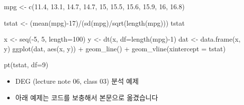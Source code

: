 \documentclass[
]{book}
\newenvironment{Shaded}{\begin{snugshade}}{\end{snugshade}}
\newcommand{\AttributeTok}[1]{\textcolor[rgb]{0.77,0.63,0.00}{#1}}
\newcommand{\DecValTok}[1]{\textcolor[rgb]{0.00,0.00,0.81}{#1}}
\newcommand{\FloatTok}[1]{\textcolor[rgb]{0.00,0.00,0.81}{#1}}
\newcommand{\FunctionTok}[1]{\textcolor[rgb]{0.00,0.00,0.00}{#1}}
\newcommand{\NormalTok}[1]{#1}
\newcommand{\OtherTok}[1]{\textcolor[rgb]{0.56,0.35,0.01}{#1}}
\newcommand{\SpecialCharTok}[1]{\textcolor[rgb]{0.00,0.00,0.00}{#1}}
\providecommand{\tightlist}{%
  \setlength{\itemsep}{0pt}\setlength{\parskip}{0pt}}
\begin{document}
\begin{Shaded}
\begin{Highlighting}[]
\NormalTok{mpg }\OtherTok{\textless{}{-}} \FunctionTok{c}\NormalTok{(}\FloatTok{11.4}\NormalTok{, }\FloatTok{13.1}\NormalTok{, }\FloatTok{14.7}\NormalTok{, }\FloatTok{14.7}\NormalTok{, }\DecValTok{15}\NormalTok{, }\FloatTok{15.5}\NormalTok{, }\FloatTok{15.6}\NormalTok{, }\FloatTok{15.9}\NormalTok{, }\DecValTok{16}\NormalTok{, }\FloatTok{16.8}\NormalTok{)}

\NormalTok{tstat }\OtherTok{\textless{}{-}}\NormalTok{ (}\FunctionTok{mean}\NormalTok{(mpg)}\SpecialCharTok{{-}}\DecValTok{17}\NormalTok{)}\SpecialCharTok{/}\NormalTok{(}\FunctionTok{sd}\NormalTok{(mpg)}\SpecialCharTok{/}\FunctionTok{sqrt}\NormalTok{(}\FunctionTok{length}\NormalTok{(mpg)))}
\NormalTok{tstat}

\NormalTok{x }\OtherTok{\textless{}{-}} \FunctionTok{seq}\NormalTok{(}\SpecialCharTok{{-}}\DecValTok{5}\NormalTok{, }\DecValTok{5}\NormalTok{, }\AttributeTok{length=}\DecValTok{100}\NormalTok{)}
\NormalTok{y }\OtherTok{\textless{}{-}} \FunctionTok{dt}\NormalTok{(x, }\AttributeTok{df=}\FunctionTok{length}\NormalTok{(mpg)}\SpecialCharTok{{-}}\DecValTok{1}\NormalTok{)}
\NormalTok{dat }\OtherTok{\textless{}{-}} \FunctionTok{data.frame}\NormalTok{(x, y)}
\FunctionTok{ggplot}\NormalTok{(dat, }\FunctionTok{aes}\NormalTok{(x, y)) }\SpecialCharTok{+}
  \FunctionTok{geom\_line}\NormalTok{() }\SpecialCharTok{+}
  \FunctionTok{geom\_vline}\NormalTok{(}\AttributeTok{xintercept =}\NormalTok{ tstat)}

\FunctionTok{pt}\NormalTok{(tstat, }\AttributeTok{df=}\DecValTok{9}\NormalTok{)}
\end{Highlighting}
\end{Shaded}

\begin{itemize}
\tightlist
\item
  DEG (lecture note 06, class 03) 분석 예제
\item
  아래 예제는 코드를 보충해서 본문으로 옮겼습니다
\end{itemize}
\end{document}
